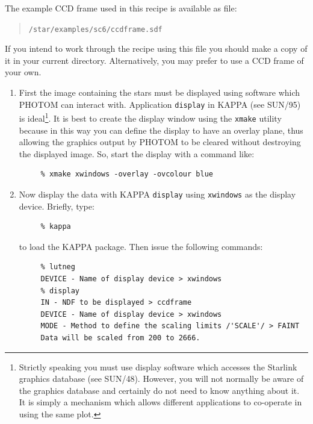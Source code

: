 \documentclass[twoside,11pt]{article}
\newcommand{\xref}[3]{#1}
\begin{document}
The example CCD frame used in this recipe is available as file:

\begin{verse}
{\tt /star/examples/sc6/ccdframe.sdf}
\end{verse}

If you intend to work through the recipe using this file you should make
a copy of it in your current directory.  Alternatively, you may prefer
to use a CCD frame of your own.

\begin{enumerate}

  \item First the image containing the stars must be displayed using
   software which PHOTOM can interact with.  Application 
   \xref{{\tt display}}{sun95}{DISPLAY}
   in KAPPA (see \xref{SUN/95}{sun95}{}\cite{SUN95}) is
   ideal\footnote{Strictly speaking you must use display software
   which accesses the Starlink graphics database (see
   \xref{SUN/48}{sun48}{}\cite{SUN48}).  However, you will not normally
   be aware of the graphics database and certainly do not need to know
   anything about it.  It is simply a mechanism which allows different
   applications to co-operate in using the same plot.}.  It is best to
   create the display window using the {\tt xmake} utility because in this
   way you can define the display to have an overlay plane, thus allowing
   the graphics output by PHOTOM to be cleared without destroying the
   displayed image. So, start the display with a command like:

\begin{verbatim}
     % xmake xwindows -overlay -ovcolour blue
\end{verbatim}

  \item Now display the data with KAPPA
   \xref{{\tt display}}{sun95}{DISPLAY} using {\tt xwindows} as the
   display device.  Briefly, type:

\begin{verbatim}
     % kappa
\end{verbatim}

   to load the KAPPA package.  Then issue the following commands:

\begin{verbatim}
     % lutneg
     DEVICE - Name of display device > xwindows 
     % display
     IN - NDF to be displayed > ccdframe
     DEVICE - Name of display device > xwindows 
     MODE - Method to define the scaling limits /'SCALE'/ > FAINT
     Data will be scaled from 200 to 2666.
\end{verbatim}


\end{enumerate}
\end{document}
